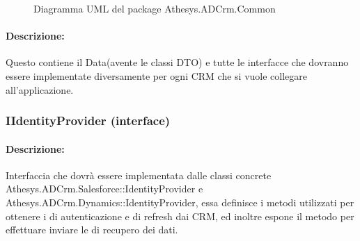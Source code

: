 	\begin{figure}[H]
		\centering
		
		\caption{Diagramma UML del package Athesys.ADCrm.Common}
		\label{fig:common}
	\end{figure}


\newpage
\paragraph{Descrizione:}
Questo  contiene il  Data(avente le classi DTO) e tutte le interfacce che dovranno essere implementate diversamente per ogni CRM che si vuole collegare all'applicazione. 

\subsubsection{IIdentityProvider (interface)}

\paragraph{Descrizione:}
Interfaccia che dovrà essere implementata dalle classi concrete Athesys.ADCrm.Salesforce::IdentityProvider e\\ Athesys.ADCrm.Dynamics::IdentityProvider, essa definisce i metodi utilizzati per ottenere i  di autenticazione e di refresh dai CRM, ed inoltre espone il metodo per effettuare inviare le  di recupero dei dati.

